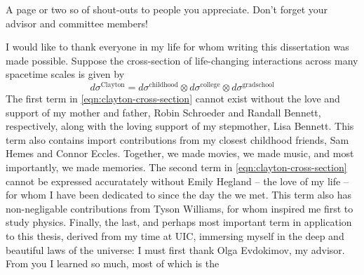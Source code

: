 \acknowledgment

A page or two so of shout-outs to people you appreciate.  Don't forget
your advisor and committee members!

I would like to thank everyone in my life for whom writing this dissertation was made possible.
Suppose the cross-section of life-changing interactions across many spacetime scales is given by
\begin{equation}
\label{eqn:clayton-cross-section}
d\sigma^{\text{Clayton}} = d\sigma^{\text{childhood}} \otimes d\sigma^{\text{college}} \otimes d\sigma^{\text{gradschool}}
\end{equation}  
The first term in \ref{eqn:clayton-cross-section} cannot exist without the love and support of my mother and father, Robin Schroeder and Randall Bennett, respectively, along with the loving support of my stepmother, Lisa Bennett.
This term also contains import contributions from my closest childhood friends, Sam Hemes and Connor Eccles.
Together, we made movies, we made music, and most importantly, we made memories.
The second term in \ref{eqn:clayton-cross-section} cannot be expressed accuratately without Emily Hegland -- the love of my life -- for whom I have been dedicated to since the day the we met.
This term also has non-negligable contributions from Tyson Williams, for whom inspired me first to study physics.
Finally, the last, and perhaps most important term in application to this thesis, derived from my time at UIC, immersing myself in the deep and beautiful laws of the universe:  I must first thank Olga Evdokimov, my advisor.
From you I learned so much, most of which is the 





